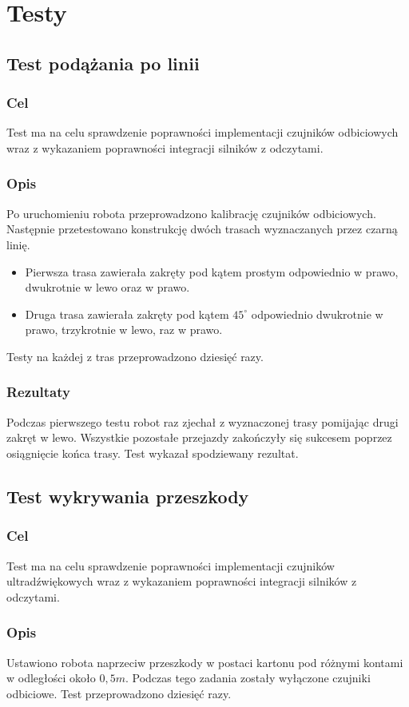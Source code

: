 \chapter{Testy}
\section{Test podążania po linii}
\subsection{Cel}
Test ma na celu sprawdzenie poprawności implementacji czujników odbiciowych wraz z wykazaniem poprawności integracji silników z odczytami.
\subsection{Opis}
Po uruchomieniu robota przeprowadzono kalibrację czujników odbiciowych. Następnie przetestowano konstrukcję dwóch trasach wyznaczanych przez czarną linię.
\begin{itemize}
    \item Pierwsza trasa zawierała zakręty pod kątem prostym odpowiednio w prawo, dwukrotnie w lewo oraz w prawo.
    \item Druga trasa zawierała zakręty pod kątem $45^\circ$ odpowiednio dwukrotnie w prawo, trzykrotnie w lewo, raz w prawo.
\end{itemize}
Testy na każdej z tras przeprowadzono dziesięć razy.
\subsection{Rezultaty}
Podczas pierwszego testu robot raz zjechał z wyznaczonej trasy pomijając drugi zakręt w lewo. Wszystkie pozostałe przejazdy zakończyły się sukcesem poprzez osiągnięcie końca trasy. Test wykazał spodziewany rezultat.

\section{Test wykrywania przeszkody}
\subsection{Cel}
Test ma na celu sprawdzenie poprawności implementacji czujników ultradźwiękowych wraz z wykazaniem poprawności integracji silników z odczytami.
\subsection{Opis}
Ustawiono robota naprzeciw przeszkody w postaci kartonu pod  różnymi kontami w odległości około $0,5m$. Podczas tego zadania zostały wyłączone czujniki odbiciowe. Test przeprowadzono dziesięć razy.
